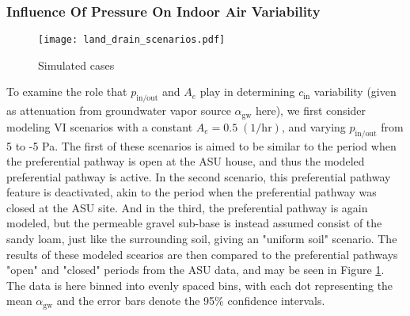 \documentclass[journal=esthag,manuscript=article]{achemso}
\begin{document}


\subsubsection{Influence Of Pressure On Indoor Air Variability}

\begin{figure}[!h] %
	\centering
  \caption{Simulated cases}
  \label{fig:land_drain_scenarios}
  \texttt{[image: land\_drain\_scenarios.pdf]}
\end{figure}

To examine the role that $p_\mathrm{in/out}$ and $A_e$ play in determining $c_\mathrm{in}$ variability (given as attenuation from groundwater vapor source $\alpha_\mathrm{gw}$ here), we first consider modeling VI scenarios with a constant $A_e = 0.5 \; \mathrm{(1/hr)}$, and varying $p_\mathrm{in/out}$ from 5 to -5 Pa.
The first of these scenarios is aimed to be similar to the period when the preferential pathway is open at the ASU house, and thus the modeled preferential pathway is active.
In the second scenario, this preferential pathway feature is deactivated, akin to the period when the preferential pathway was closed at the ASU site.
And in the third, the preferential pathway is again modeled, but the permeable gravel sub-base is instead assumed consist of the sandy loam, just like the surrounding soil, giving an "uniform soil" scenario. %
The results of these modeled scearios are then compared to the preferential pathways "open" and "closed" periods from the ASU data, and may be seen in Figure \ref{fig:land_drain_scenarios}.
The data is here binned into evenly spaced bins, with each dot representing the mean $\alpha_\mathrm{gw}$ and the error bars denote the 95\% confidence intervals.
\end{document}
